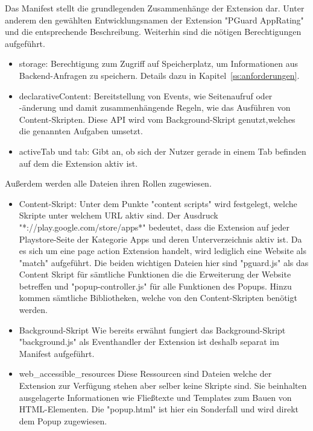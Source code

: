 Das Manifest stellt die grundlegenden Zusammenhänge der Extension dar. Unter anderem den gewählten Entwicklungsnamen der Extension "PGuard AppRating" und die entsprechende Beschreibung.
Weiterhin sind die nötigen Berechtigungen aufgeführt.
\begin{itemize}
	\item storage:
	Berechtigung zum Zugriff auf Speicherplatz, um Informationen aus Backend-Anfragen zu speichern. Details dazu in Kapitel~\ref{ss:anforderungen}.
	\item declarativeContent:
	Bereitstellung von Events, wie Seitenaufruf oder -änderung und damit zusammenhängende Regeln, wie das Ausführen von Content-Skripten. Diese API wird vom Background-Skript genutzt,welches die genannten Aufgaben umsetzt.
	\item activeTab und tab:
	Gibt an, ob sich der Nutzer gerade in einem Tab befinden auf dem die Extension aktiv ist.
\end{itemize}
Außerdem werden alle Dateien ihren Rollen zugewiesen.
\begin{itemize}
	\item Content-Skript:
	Unter dem Punkte "content scripts" wird festgelegt, welche Skripte unter welchem URL aktiv sind. Der Ausdruck 
	"*://play.google.com/store/apps*" 
	bedeutet, dass die Extension auf jeder Playstore-Seite der Kategorie Apps und deren Unterverzeichnis aktiv ist. Da es sich um eine page action Extension handelt, wird lediglich eine Website als "match" aufgeführt. Die beiden wichtigen Dateien hier sind "pguard.js" als das Content Skript für sämtliche Funktionen die die Erweiterung der Website betreffen und "popup-controller.js" für alle Funktionen des Popups. Hinzu kommen sämtliche Bibliotheken, welche von den Content-Skripten benötigt werden.
	\item Background-Skript
	Wie bereits erwähnt fungiert das Background-Skript "background.js" als Eventhandler der Extension ist deshalb separat im Manifest aufgeführt.
	\item web\_accessible\_resources
	Diese Ressourcen sind Dateien welche der Extension zur Verfügung stehen aber selber keine Skripte sind. Sie beinhalten ausgelagerte Informationen wie Fließtexte und Templates zum Bauen von HTML-Elementen. Die "popup.html" ist hier ein Sonderfall und wird direkt dem Popup zugewiesen.
\end{itemize}









